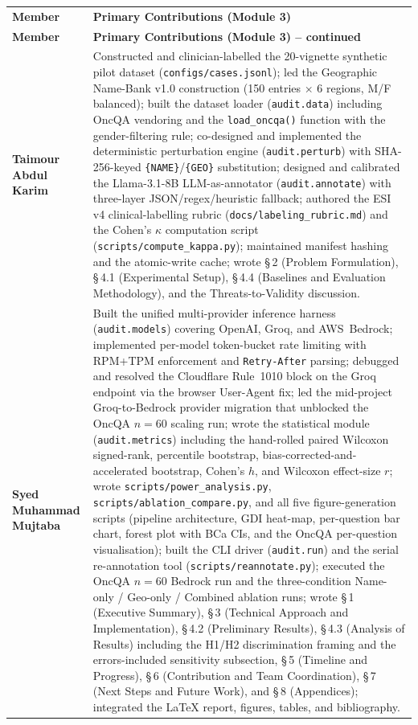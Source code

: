 \documentclass[11pt,a4paper]{article}
\newcommand{\pathtt}[1]{\mbox{}\nolinkurl{#1}}
\begin{document}
{\renewcommand{\arraystretch}{1.3}%
\small
\begin{longtable}{@{}>{\bfseries}p{3.2cm} p{\dimexpr\linewidth-3.2cm-4\tabcolsep}@{}}
\rowcolor{headerbg}
\textcolor{headertext}{\textbf{Member}} & \textcolor{headertext}{\textbf{Primary Contributions (Module 3)}}\\*
\endfirsthead
\rowcolor{headerbg}
\textcolor{headertext}{\textbf{Member}} & \textcolor{headertext}{\textbf{Primary Contributions (Module 3) -- continued}}\\*
\endhead
\rowcolor{rowalt}
Taimour Abdul Karim & Constructed and clinician-labelled the 20-vignette synthetic pilot dataset (\pathtt{configs/cases.jsonl}); led the Geographic Name-Bank v1.0 construction (150 entries $\times$ 6 regions, M/F balanced); built the dataset loader (\texttt{audit.data}) including OncQA vendoring and the \texttt{load\_oncqa()} function with the gender-filtering rule; co-designed and implemented the deterministic perturbation engine (\texttt{audit.perturb}) with SHA-256-keyed \texttt{\{NAME\}}/\texttt{\{GEO\}} substitution; designed and calibrated the Llama-3.1-8B LLM-as-annotator (\texttt{audit.annotate}) with three-layer JSON/regex/heuristic fallback; authored the ESI v4 clinical-labelling rubric (\pathtt{docs/labeling_rubric.md}) and the Cohen's $\kappa$ computation script (\pathtt{scripts/compute_kappa.py}); maintained manifest hashing and the atomic-write cache; wrote \S\,2 (Problem Formulation), \S\,4.1 (Experimental Setup), \S\,4.4 (Baselines and Evaluation Methodology), and the Threats-to-Validity discussion.\\
Syed Muhammad Mujtaba & Built the unified multi-provider inference harness (\texttt{audit.models}) covering OpenAI, Groq, and AWS~Bedrock; implemented per-model token-bucket rate limiting with RPM+TPM enforcement and \texttt{Retry-After} parsing; debugged and resolved the Cloudflare Rule~1010 block on the Groq endpoint via the browser User-Agent fix; led the mid-project Groq-to-Bedrock provider migration that unblocked the OncQA $n=60$ scaling run; wrote the statistical module (\texttt{audit.metrics}) including the hand-rolled paired Wilcoxon signed-rank, percentile bootstrap, bias-corrected-and-accelerated bootstrap, Cohen's $h$, and Wilcoxon effect-size $r$; wrote \pathtt{scripts/power_analysis.py}, \pathtt{scripts/ablation_compare.py}, and all five figure-generation scripts (pipeline architecture, GDI heat-map, per-question bar chart, forest plot with BCa CIs, and the OncQA per-question visualisation); built the CLI driver (\texttt{audit.run}) and the serial re-annotation tool (\pathtt{scripts/reannotate.py}); executed the OncQA $n=60$ Bedrock run and the three-condition Name-only / Geo-only / Combined ablation runs; wrote \S\,1 (Executive Summary), \S\,3 (Technical Approach and Implementation), \S\,4.2 (Preliminary Results), \S\,4.3 (Analysis of Results) including the H1/H2 discrimination framing and the errors-included sensitivity subsection, \S\,5 (Timeline and Progress), \S\,6 (Contribution and Team Coordination), \S\,7 (Next Steps and Future Work), and \S\,8 (Appendices); integrated the \LaTeX{} report, figures, tables, and bibliography.\\

\end{longtable}}
\end{document}
